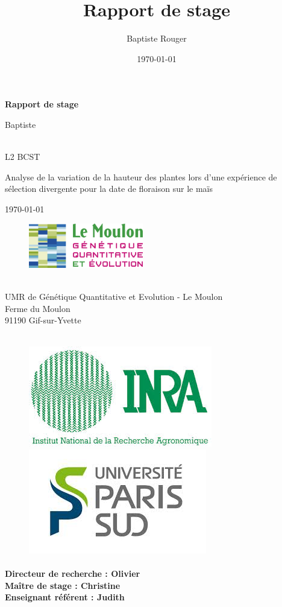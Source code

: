 \documentclass[12pt,a4paper]{article}
\author{Baptiste Rouger}
\title{Rapport de stage}
\date{\today}
\begin{document}
	\begin{titlepage}
		
		\begin{center}
			\vfill
			
			{\Huge \textbf{Rapport de stage}}
			
			\vfill
			
			{\LARGE Baptiste }
			
			~\\L2 BCST
			
			\vfill
			
			{\Huge Analyse de la variation de la hauteur des plantes lors d'une expérience de sélection divergente pour la date de floraison sur le maïs}
			
			\vfill
			
			{\large\today}
			
			\vfill
			\end{center}
			
			\begin{figure}
				\includegraphics[width=5cm]{logo.jpg}
			\end{figure} ~\\
			UMR de Génétique Quantitative et Evolution - Le Moulon\\
			Ferme du Moulon\\
			91190 Gif-sur-Yvette \\ \\
			
			\begin{figure}[h]
				\centering
				\includegraphics[width = 4 cm]{inra.jpg}
				\includegraphics[width = 4 cm]{upsud.jpg}
			\end{figure}
			
			\paragraph*{Directeur de recherche : Olivier  \\
			Maître de stage : Christine \\
			Enseignant référent : Judith  }
			\vfill
	\end{titlepage}
\end{document}
